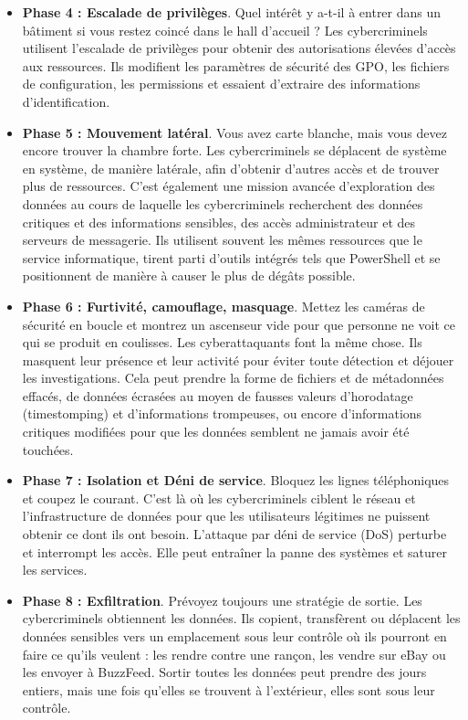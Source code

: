 \begin{itemize}
 \item \textbf{Phase 4 : Escalade de privilèges}. Quel intérêt y a-t-il à entrer dans un bâtiment si vous restez coincé dans le hall d’accueil ? Les cybercriminels utilisent l’escalade de privilèges pour obtenir des autorisations élevées d’accès aux ressources. Ils modifient les paramètres de sécurité des GPO, les fichiers de configuration, les permissions et essaient d’extraire des informations d’identification.

 \item \textbf{Phase 5 : Mouvement latéral}. Vous avez carte blanche, mais vous devez encore trouver la chambre forte. Les cybercriminels se déplacent de système en système, de manière latérale, afin d’obtenir d’autres accès et de trouver plus de ressources. C’est également une mission avancée d’exploration des données au cours de laquelle les cybercriminels recherchent des données critiques et des informations sensibles, des accès administrateur et des serveurs de messagerie. Ils utilisent souvent les mêmes ressources que le service informatique, tirent parti d’outils intégrés tels que PowerShell et se positionnent de manière à causer le plus de dégâts possible.

 \item \textbf{Phase 6 :  Furtivité, camouflage, masquage}. Mettez les caméras de sécurité en boucle et montrez un ascenseur vide pour que personne ne voit ce qui se produit en coulisses. Les cyberattaquants font la même chose. Ils masquent leur présence et leur activité pour éviter toute détection et déjouer les investigations. Cela peut prendre la forme de fichiers et de métadonnées effacés, de données écrasées au moyen de fausses valeurs d’horodatage (timestomping) et d’informations trompeuses, ou encore d’informations critiques modifiées pour que les données semblent ne jamais avoir été touchées.

 \item \textbf{Phase 7 :  Isolation et Déni de service}. Bloquez les lignes téléphoniques et coupez le courant. C’est là où les cybercriminels ciblent le réseau et l’infrastructure de données pour que les utilisateurs légitimes ne puissent obtenir ce dont ils ont besoin. L’attaque par déni de service (DoS) perturbe et interrompt les accès. Elle peut entraîner la panne des systèmes et saturer les services.

 \item \textbf{Phase 8 :  Exfiltration}. Prévoyez toujours une stratégie de sortie. Les cybercriminels obtiennent les données. Ils copient, transfèrent ou déplacent les données sensibles vers un emplacement sous leur contrôle où ils pourront en faire ce qu’ils veulent : les rendre contre une rançon, les vendre sur eBay ou les envoyer à BuzzFeed. Sortir toutes les données peut prendre des jours entiers, mais une fois qu’elles se trouvent à l’extérieur, elles sont sous leur contrôle.

\end{itemize}


